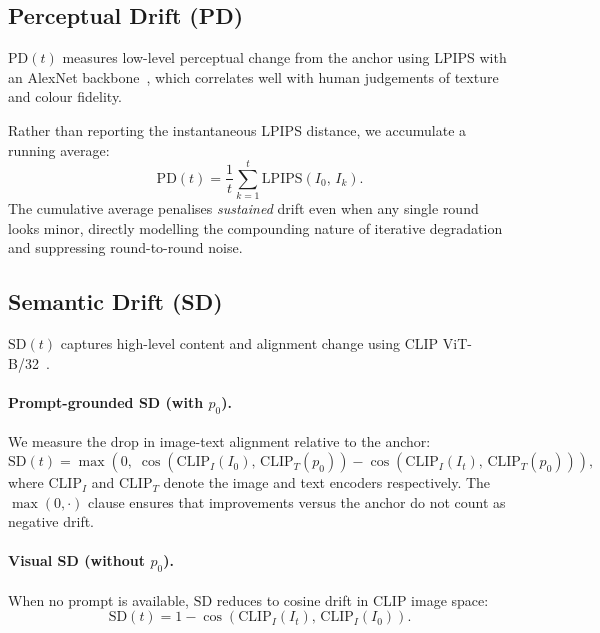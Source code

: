 \documentclass[sigconf]{acmart}
\newcommand{\PD}{\ensuremath{\mathrm{PD}}}
\newcommand{\SD}{\ensuremath{\mathrm{SD}}}
\newcommand{\Izero}{\ensuremath{I_0}}
\newcommand{\It}{\ensuremath{I_t}}
\newcommand{\pzero}{\ensuremath{p_0}}
\begin{document}
\subsection{Perceptual Drift (PD)}
$\PD(t)$ measures low-level perceptual change from the anchor using LPIPS
with an AlexNet backbone~\cite{zhang2018lpips}, which correlates well
with human judgements of texture and colour fidelity.

Rather than reporting the instantaneous LPIPS distance, we accumulate a
running average:
\begin{equation}
  \PD(t) = \frac{1}{t} \sum_{k=1}^{t}
    \mathrm{LPIPS}(\Izero,\, I_k).
  \label{eq:pd}
\end{equation}
The cumulative average penalises \emph{sustained} drift even when any
single round looks minor, directly modelling the compounding nature of
iterative degradation and suppressing round-to-round noise.

\subsection{Semantic Drift (SD)}
$\SD(t)$ captures high-level content and alignment change using CLIP
ViT-B/32~\cite{radford2021clip}.

\paragraph{Prompt-grounded SD (with $\pzero$).}
We measure the drop in image-text alignment relative to the anchor:
\begin{equation}
  \SD(t) = \max\!\left(0,\;
    \cos\!\left(\mathrm{CLIP}_I(\Izero),\, \mathrm{CLIP}_T(\pzero)\right)
    -
    \cos\!\left(\mathrm{CLIP}_I(\It),\, \mathrm{CLIP}_T(\pzero)\right)
  \right),
  \label{eq:sd_prompt}
\end{equation}
where $\mathrm{CLIP}_I$ and $\mathrm{CLIP}_T$ denote the image and text
encoders respectively.
The $\max(0,\cdot)$ clause ensures that improvements versus the anchor
do not count as negative drift.

\paragraph{Visual SD (without $\pzero$).}
When no prompt is available, $\SD$ reduces to cosine drift in CLIP image
space:
\begin{equation}
  \SD(t) = 1 - \cos\!\left(\mathrm{CLIP}_I(\It),\,
    \mathrm{CLIP}_I(\Izero)\right).
  \label{eq:sd_visual}
\end{equation}
\end{document}
